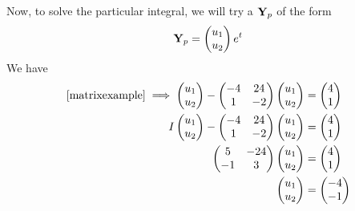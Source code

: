 Now, to solve the particular integral, we will try a \(\vb Y_p\) of the form
\[
	\vb Y_p = \begin{pmatrix}
		u_1 \\ u_2
	\end{pmatrix} e^t
\]
We have
\begin{align*}
	\eqref{matrixexample} \implies \begin{pmatrix}
		u_1 \\ u_2
	\end{pmatrix} - \begin{pmatrix}
		-4 & 24 \\ 1 & -2
	\end{pmatrix}\begin{pmatrix}
		u_1 \\ u_2
	\end{pmatrix} & = \begin{pmatrix}
		4 \\ 1
	\end{pmatrix} \\
	I\begin{pmatrix}
		u_1 \\ u_2
	\end{pmatrix} - \begin{pmatrix}
		-4 & 24 \\ 1 & -2
	\end{pmatrix}\begin{pmatrix}
		u_1 \\ u_2
	\end{pmatrix}                               & = \begin{pmatrix}
		4 \\ 1
	\end{pmatrix} \\
	\begin{pmatrix}
		5 & -24 \\ -1 & 3
	\end{pmatrix}\begin{pmatrix}
		u_1 \\ u_2
	\end{pmatrix}                                                             & = \begin{pmatrix}
		4 \\ 1
	\end{pmatrix} \\
	\begin{pmatrix}
		u_1 \\ u_2
	\end{pmatrix}                                                                                       & = \begin{pmatrix}
		-4 \\ -1
	\end{pmatrix}
\end{align*}
